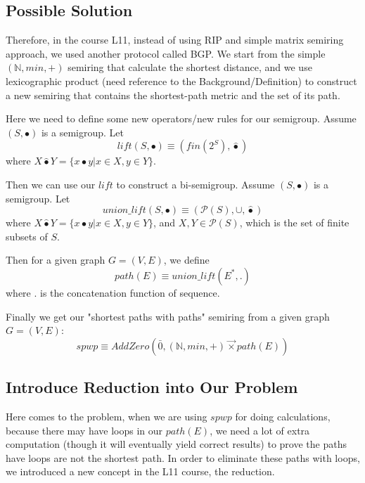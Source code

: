 \documentclass[a4paper,10pt]{article}
\begin{document}
\subsection{Possible Solution}
Therefore, in the course L11, instead of using RIP and simple matrix semiring approach, we used another protocol called BGP. We start from the simple $(\mathbb{N},min,+)$ semiring that calculate the shortest distance, and we use lexicographic product (need reference to the Background/Definition) to construct a new semiring that contains the shortest-path metric and the set of its path.

Here we need to define some new operators/new rules for our semigroup.
Assume $(S,\bullet)$ is a semigroup. Let
\begin{equation}
  \label{eq:lift:def} 
  lift(S,\bullet)  \equiv (fin(2^S),\hat\bullet)
\end{equation}   
where
$X \hat\bullet Y = \{x\bullet y |x\in X,y\in Y\}$.

Then we can use our $lift$ to construct a bi-semigroup.
Assume $(S,\bullet)$ is a semigroup. Let
\begin{equation}
  \label{eq:unionlift:def} 
  union\_lift(S,\bullet)\equiv (\mathcal{P}(S),\cup,\hat\bullet)
\end{equation}  
where
$X \hat\bullet Y = \{x\bullet y |x\in X,y\in Y\}$, and $X,Y \in \mathcal{P}(S)$, which is the set of finite subsets of $S$.

Then for a given graph $G = (V,E)$, we define
\begin{equation}
  \label{eq:path:def} 
  path(E)\equiv union\_lift(E^*,.)
\end{equation}  
where . is the concatenation function of sequence.

Finally we get our "shortest paths with paths" semiring from a given graph $G = (V,E)$: 
\begin{equation}
  \label{eq:spwp:def} 
  spwp \equiv AddZero(\bar0,(\mathbb{N},min,+) \overrightarrow{\times} path(E))
\end{equation} 

\subsection{Introduce Reduction into Our Problem}
Here comes to the problem, when we are using $spwp$ for doing calculations, because there may have loops in our $path(E)$, we need a lot of extra computation (though it will eventually yield correct results) to prove the paths have loops are not the shortest path.
In order to eliminate these paths with loops, we introduced a new concept in the L11 course, the reduction.
\end{document}
